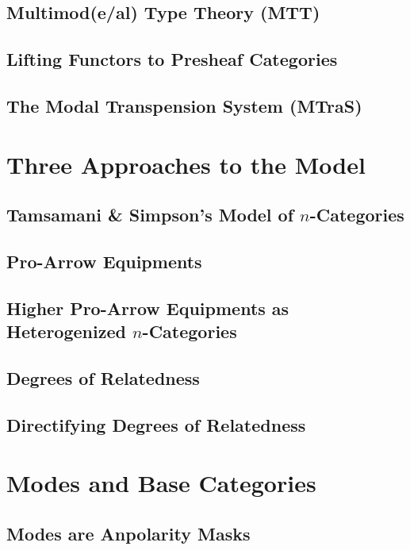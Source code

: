 \documentclass[twoLevelNum]{higherStructures} %
\begin{document}
\subsection{Multimod(e/al) Type Theory (MTT)}

\subsection{Lifting Functors to Presheaf Categories}

\subsection{The Modal Transpension System (MTraS)}

\section{Three Approaches to the Model}

\subsection{Tamsamani \& Simpson's Model of $n$-Categories}

\subsection{Pro-Arrow Equipments}

\subsection{Higher Pro-Arrow Equipments as Heterogenized $n$-Categories}

\subsection{Degrees of Relatedness}

\subsection{Directifying Degrees of Relatedness}

\section{Modes and Base Categories}

\subsection{Modes are Anpolarity Masks}
\end{document}
